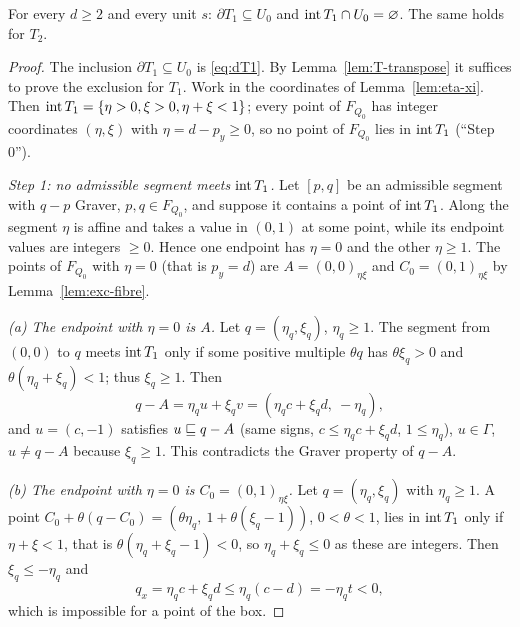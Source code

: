\begin{proposition}\label{prop:hole-exclusion}
For every $d\ge2$ and every unit $s$: $\partial T_1\subseteq U_0$ and $\operatorname{int} T_1\cap U_0=\varnothing$. The same holds for $T_2$.
\end{proposition}
\begin{proof}
The inclusion $\partial T_1\subseteq U_0$ is \eqref{eq:dT1}. By Lemma~\ref{lem:T-transpose} it suffices to prove the exclusion for $T_1$. Work in the coordinates of Lemma~\ref{lem:eta-xi}. Then $\operatorname{int} T_1=\{\eta>0,\xi>0,\eta+\xi<1\}$; every point of $F_{Q_0}$ has integer coordinates $(\eta,\xi)$ with $\eta=d-p_y\ge0$, so no point of $F_{Q_0}$ lies in $\operatorname{int} T_1$ (``Step 0'').

\emph{Step 1: no admissible segment meets $\operatorname{int} T_1$.} Let $[p,q]$ be an admissible segment with $q-p$ Graver, $p,q\in F_{Q_0}$, and suppose it contains a point of $\operatorname{int} T_1$. Along the segment $\eta$ is affine and takes a value in $(0,1)$ at some point, while its endpoint values are integers $\ge0$. Hence one endpoint has $\eta=0$ and the other $\eta\ge1$. The points of $F_{Q_0}$ with $\eta=0$ (that is $p_y=d$) are $A=(0,0)_{\eta\xi}$ and $C_0=(0,1)_{\eta\xi}$ by Lemma~\ref{lem:exc-fibre}.

\emph{(a) The endpoint with $\eta=0$ is $A$.} Let $q=(\eta_q,\xi_q)$, $\eta_q\ge1$. The segment from $(0,0)$ to $q$ meets $\operatorname{int} T_1$ only if some positive multiple $\theta q$ has $\theta\xi_q>0$ and $\theta(\eta_q+\xi_q)<1$; thus $\xi_q\ge1$. Then
\[
  q-A=\eta_qu+\xi_qv=(\eta_qc+\xi_qd,\ -\eta_q),
\]
and $u=(c,-1)$ satisfies $u\sqsubseteq q-A$ (same signs, $c\le\eta_qc+\xi_qd$, $1\le\eta_q$), $u\in\Gamma$, $u\ne q-A$ because $\xi_q\ge1$. This contradicts the Graver property of $q-A$.

\emph{(b) The endpoint with $\eta=0$ is $C_0=(0,1)_{\eta\xi}$.} Let $q=(\eta_q,\xi_q)$ with $\eta_q\ge1$. A point $C_0+\theta(q-C_0)=(\theta\eta_q,\ 1+\theta(\xi_q-1))$, $0<\theta<1$, lies in $\operatorname{int} T_1$ only if $\eta+\xi<1$, that is $\theta(\eta_q+\xi_q-1)<0$, so $\eta_q+\xi_q\le0$ as these are integers. Then $\xi_q\le-\eta_q$ and
\[
  q_x=\eta_qc+\xi_qd\le\eta_q(c-d)=-\eta_qt<0,
\]
which is impossible for a point of the box.


\end{proof}

